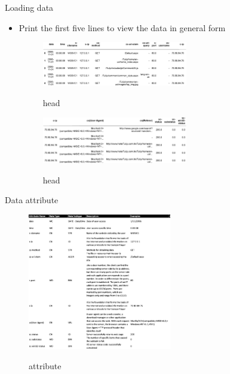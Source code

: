 \documentclass[
 size=14pt,
 paper=smartboard,  %
 mode=present, 		%
 display=slides, 	%
 style=tuliplab,  	%
 pauseslide,
 fleqn,leqno]{powerdot}
\begin{document}
\begin{slide}[toc=,bm=]{Loading data}

\begin{itemize}
\item
Print the first five lines to view the data in general form
\begin{figure}
	\centering
	\includegraphics[width=0.6\textwidth]{Capture2.eps}\\
	\caption{head}\label{fig:timg}
\end{figure}
\begin{figure}
	\centering
	\includegraphics[width=0.6\textwidth]{Capture3.eps}\\
	\caption{head}\label{fig:timg}
\end{figure}
\end{itemize}

\end{slide}


\begin{slide}[toc=,bm=]{Data attribute}
\begin{figure}
	\centering
	\includegraphics[width=0.56\textwidth]{Capture4.eps}\\
	\caption{attribute }\label{fig:timg}
\end{figure}
\end{slide}
\end{document}
